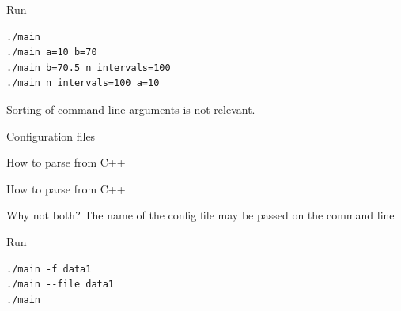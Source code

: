 \documentclass[10pt,aspectratio=169]{beamer}
\begin{document}
\begin{frame}[fragile]{Run}
    \begin{verbatim}
./main
./main a=10 b=70
./main b=70.5 n_intervals=100
./main n_intervals=100 a=10
    \end{verbatim}

    \vspace{1cm}
    
   	Sorting of command line arguments is not relevant.
\end{frame}

\begin{frame}[fragile]{Configuration files}
    
\end{frame}

\begin{frame}[fragile]{How to parse from C++}
    
\end{frame}

\begin{frame}[fragile]{How to parse from C++}
    
\end{frame}

\begin{frame}[fragile]{Why not both?}
    The name of the config file may be passed on the command line
        
    
\end{frame}

\begin{frame}[fragile]{Run}
    \begin{verbatim}
./main -f data1
./main --file data1
./main
    \end{verbatim}
\end{frame}
\end{document}
